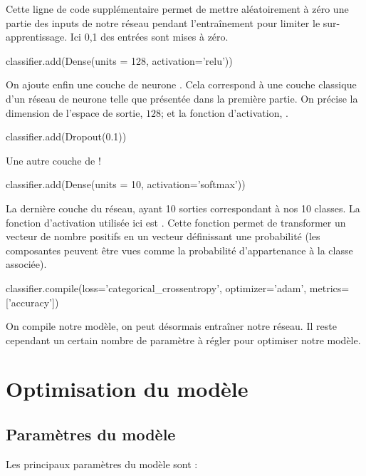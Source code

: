 Cette ligne de code supplémentaire permet de mettre aléatoirement à zéro une partie des 
inputs de notre réseau pendant l'entraînement pour limiter le sur-apprentissage. Ici 0,1%
des entrées sont mises à zéro.

\begin{codeblock}
classifier.add(Dense(units = 128, activation='relu'))
\end{codeblock}

On ajoute enfin une couche de neurone . 
Cela correspond à une couche classique d'un réseau de neurone telle que présentée 
dans la première partie. 
On précise la dimension de l'espace de sortie, $128$; et la fonction 
d'activation, . 

\begin{codeblock}
classifier.add(Dropout(0.1)) 
\end{codeblock}

Une autre couche de  !


\begin{codeblock}
classifier.add(Dense(units = 10, activation='softmax'))
\end{codeblock}

La dernière couche du réseau, ayant 10 sorties correspondant à nos 10 classes. 
La fonction d'activation utilisée ici est . 
Cette fonction permet de transformer un vecteur de nombre positifs en 
un vecteur définissant une probabilité (les composantes peuvent être 
vues comme la probabilité d'appartenance à la classe associée).
    
	
\begin{codeblock}
classifier.compile(loss='categorical_crossentropy', optimizer='adam', metrics=['accuracy'])
\end{codeblock}

On compile notre modèle, on peut désormais entraîner notre réseau. 
Il reste cependant un certain nombre de paramètre à régler pour optimiser notre modèle.

\section{Optimisation du modèle}

\subsection{Paramètres du modèle}

Les principaux paramètres du modèle sont :

